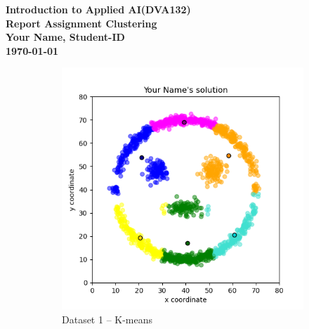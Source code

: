 \documentclass[10pt,a4paper]{article}
\newcommand{\course}{Introduction to Applied AI\xspace}
\newcommand{\courseCode}{DVA132\xspace}
\begin{document}
\begin{mdframed}
\begin{center}
\textbf{\course (\courseCode)}\\
\textbf{Report Assignment Clustering}\\
\textbf{Your Name, Student-ID}\\    %
\textbf{\today}
\end{center}
\end{mdframed}

\begin{figure}[htb]
	\centering
	\begin{subfigure}[b]{0.3\textwidth}
	    \includegraphics[width=\textwidth]{clustering_solution.png} %
	    \caption{Dataset 1 -- K-means}
	    \label{fig:kmeans}
	\end{subfigure}
	\begin{subfigure}[b]{0.3\textwidth}

\end{subfigure}
\end{figure}
\end{document}
